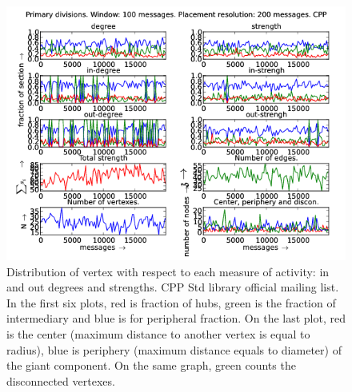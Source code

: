 \documentclass[%
 aip,
 jmp,%
 amsmath,amssymb,
 reprint,%
]{revtex4-1}
\begin{document}
\begin{figure}[hbtp] 
   \centering
        \includegraphics[width=\textwidth]{figs/CPP/100}
    \caption{Distribution of vertex with respect to each measure of activity: in and out degrees and strengths. CPP Std library official mailing list. In the first six plots, red is fraction of hubs, green is the fraction of intermediary and blue is for peripheral fraction. On the last plot, red is the center (maximum distance to another vertex is equal to radius), blue is periphery (maximum distance equals to diameter) of the giant component. On the same graph, green counts the disconnected vertexes.}
    \label{fig:cpp100}
\end{figure}
\end{document}
